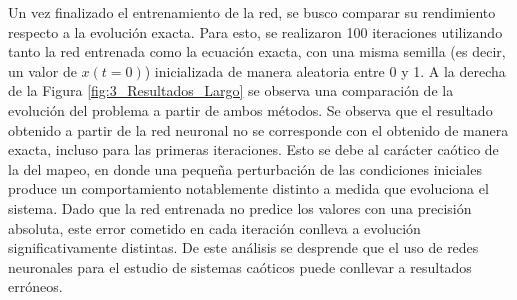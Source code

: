 Un vez finalizado el entrenamiento de la red, se busco comparar su rendimiento respecto a la evolución exacta. Para esto, se realizaron 100 iteraciones utilizando tanto la red entrenada como la ecuación exacta, con una misma semilla (es decir, un valor de $x(t=0)$) inicializada de manera aleatoria entre 0 y 1. A la derecha de la Figura \ref{fig:3_Resultados_Largo} se observa una comparación de la evolución del problema a partir de ambos métodos. Se observa que el resultado obtenido a partir de la red neuronal no se corresponde con el obtenido de manera exacta, incluso para las primeras iteraciones. Esto se debe al carácter caótico de la del mapeo, en donde una pequeña perturbación de las condiciones iniciales produce un comportamiento notablemente distinto a medida que evoluciona el sistema. Dado que la red entrenada no predice los valores con una precisión absoluta, este error cometido en cada iteración conlleva a evolución significativamente distintas. De este análisis se desprende que el uso de redes neuronales para el estudio de sistemas caóticos puede conllevar a resultados erróneos.